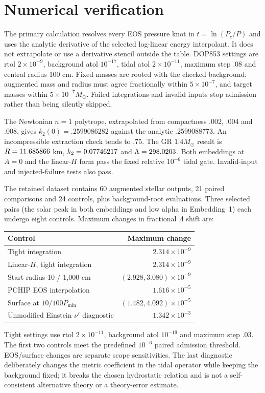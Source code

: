 \documentclass[twocolumn,prd,superscriptaddress,nofootinbib]{revtex4-2}
\begin{document}
\section{Numerical verification}
The primary calculation resolves every EOS pressure knot in
$t=\ln(P_c/P)$ and uses the analytic derivative of the selected log-linear
energy interpolant. It does not extrapolate or use a derivative stencil
outside the table. DOP853 settings are rtol $2\times10^{-9}$,
background atol $10^{-17}$, tidal atol $2\times10^{-11}$, maximum step
.08 and central radius 100 cm. Fixed masses are rooted with the checked
background; augmented mass and radius must agree fractionally within
$5\times10^{-7}$, and target masses within $5\times10^{-7}M_\odot$.
Failed integrations and invalid inputs stop admission rather than being
silently skipped.

The Newtonian $n=1$ polytrope, extrapolated from compactness .002, .004
and .008, gives $k_2(0)=.2599086282$ against the analytic .2599088773.
An incompressible extraction check tends to .75. The GR $1.4M_\odot$
result is $R=11.685866$ km, $k_2=0.07746217$ and
$\Lambda=298.0203$. Both embeddings at $A=0$ and the linear-$H$
form pass the fixed relative $10^{-6}$ tidal gate. Invalid-input and
injected-failure tests also pass.

The retained dataset contains 60 augmented stellar outputs, 21 paired
comparisons and 24 controls, plus background-root evaluations. Three
selected pairs (the solar peak in both embeddings and low alpha in
Embedding~1) each undergo eight controls. Maximum changes in fractional
$\Lambda$ shift are:
\begin{center}
\small\setlength{\tabcolsep}{4pt}
\begin{tabular}{lr}
\hline\hline
Control & Maximum change \\
\hline
Tight integration & $2.314\times10^{-9}$ \\
Linear-$H$, tight integration & $2.314\times10^{-9}$ \\
Start radius 10 / 1,000 cm & $(2.928,3.080)\times10^{-9}$ \\
PCHIP EOS interpolation & $1.616\times10^{-5}$ \\
Surface at $10/100P_{\min}$ & $(1.482,4.092)\times10^{-5}$ \\
Unmodified Einstein $\nu'$ diagnostic & $1.342\times10^{-3}$ \\
\hline\hline
\end{tabular}
\end{center}
Tight settings use rtol $2\times10^{-11}$, background atol $10^{-19}$
and maximum step .03. The first two controls meet the predefined
$10^{-6}$ paired admission threshold. EOS/surface changes are separate
scope sensitivities. The last diagnostic deliberately changes the metric
coefficient in the tidal operator while keeping the background fixed;
it breaks the chosen hydrostatic relation and is not a self-consistent
alternative theory or a theory-error estimate.
\end{document}
